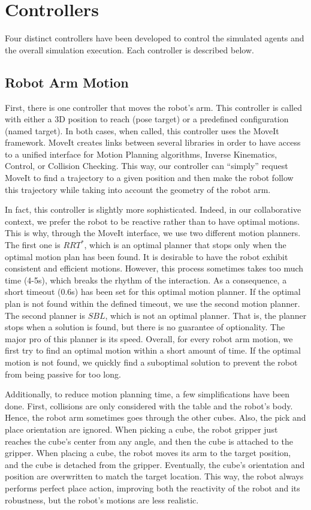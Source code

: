 \section{Controllers}

Four distinct controllers have been developed to control the simulated agents and the overall simulation execution. Each controller is described below. 

\subsection{Robot Arm Motion}

First, there is one controller that moves the robot's arm. This controller is called with either a 3D position to reach (pose target) or a predefined configuration (named target). In both cases, when called, this controller uses the MoveIt framework. MoveIt creates links between several libraries in order to have access to a unified interface for Motion Planning algorithms, Inverse Kinematics, Control, or Collision Checking. This way, our controller can ``simply'' request MoveIt to find a trajectory to a given position and then make the robot follow this trajectory while taking into account the geometry of the robot arm.

In fact, this controller is slightly more sophisticated. Indeed, in our collaborative context, we prefer the robot to be reactive rather than to have optimal motions. This is why, through the MoveIt interface, we use two different motion planners. The first one is $RRT^*$, which is an optimal planner that stops only when the optimal motion plan has been found. It is desirable to have the robot exhibit consistent and efficient motions. However, this process sometimes takes too much time (4-5s), which breaks the rhythm of the interaction. As a consequence, a short timeout (0.6s) has been set for this optimal motion planner. If the optimal plan is not found within the defined timeout, we use the second motion planner. 
The second planner is $SBL$, which is not an optimal planner. That is, the planner stops when a solution is found, but there is no guarantee of optionality. The major pro of this planner is its speed.
Overall, for every robot arm motion, we first try to find an optimal motion within a short amount of time. If the optimal motion is not found, we quickly find a suboptimal solution to prevent the robot from being passive for too long.

Additionally, to reduce motion planning time, a few simplifications have been done. 
First, collisions are only considered with the table and the robot's body. Hence, the robot arm sometimes goes through the other cubes.
Also, the pick and place orientation are ignored. When picking a cube, the robot gripper just reaches the cube's center from any angle, and then the cube is attached to the gripper. When placing a cube, the robot moves its arm to the target position, and the cube is detached from the gripper. Eventually, the cube's orientation and position are overwritten to match the target location. This way, the robot always performs perfect place action, improving both the reactivity of the robot and its robustness, but the robot's motions are less realistic.


